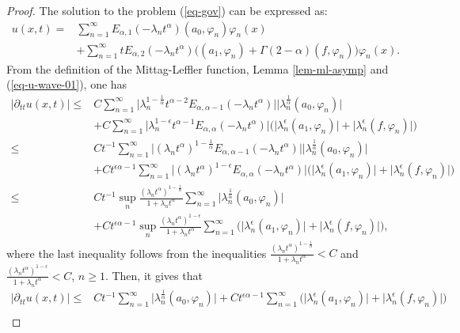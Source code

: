 \documentclass[11pt]{article}
\numberwithin{equation}{section}
\begin{document}
\begin{proof}
The solution to the problem (\ref{eq-gov}) can be expressed as:
\begin{align}\nonumber
u(x,t)=&\sum_{n=1}^{\infty}E_{\alpha,1}(-\lambda_nt^\alpha)(a_0,\varphi_n)\varphi_n(x)\\\label{eq-u-wave-01}
&+\sum_{n=1}^{\infty} t E_{\alpha,2}(-\lambda_n t^\alpha)\Big((a_1, \varphi_n)+\Gamma(2-\alpha)(f, \varphi_n)\Big) \varphi_n(x).
\end{align}
From the definition of the Mittag-Leffler function, Lemma \ref{lem-ml-asymp} and (\ref{eq-u-wave-01}), one has
\begin{align*}
|\partial_{tt}u(x,t)|
\le& C\sum_{n=1}^{\infty}  \big|\lambda_n^{1-\frac{1}{\alpha}}t^{\alpha-2}E_{\alpha,\alpha-1}(-\lambda_n t^\alpha)\big|\big|\lambda_n^{\frac{1}{\alpha}}(a_0, \varphi_n)\big|\\
&+C\sum_{n=1}^{\infty}\big|\lambda_n^{1-\epsilon}t^{\alpha-1}E_{\alpha,\alpha}(-\lambda_n t^\alpha)\big|\Big(\big|\lambda_n^{\epsilon}(a_1, \varphi_n)\big|+\big|\lambda_n^{\epsilon}(f, \varphi_n)\big|\Big)\\
\le&Ct^{-1}\sum_{n=1}^{\infty}  \big|(\lambda_nt^\alpha)^{1-\frac{1}{\alpha}}E_{\alpha,\alpha-1}(-\lambda_n t^\alpha)\big|\big|\lambda_n^{\frac{1}{\alpha}}(a_0, \varphi_n)\big|\\
&+Ct^{\epsilon\alpha-1}\sum_{n=1}^{\infty}  \big|(\lambda_nt^\alpha)^{1-\epsilon}E_{\alpha,\alpha}(-\lambda_n t^\alpha)\big|\Big(\big|\lambda_n^{\epsilon}(a_1, \varphi_n)\big|+\big|\lambda_n^{\epsilon}(f, \varphi_n)\big|\Big)\\
\le&Ct^{-1}\sup_n\frac{(\lambda_nt^\alpha)^{1-\frac{1}{\alpha}}}{1+\lambda_nt^\alpha}\sum_{n=1}^{\infty}\big|\lambda_n^{\frac{1}{\alpha}}(a_0, \varphi_n)\big|\\
&+Ct^{\epsilon\alpha-1}\sup_n\frac{(\lambda_nt^\alpha)^{1-\epsilon}}{1+\lambda_nt^\alpha}\sum_{n=1}^{\infty}\Big(\big|\lambda_n^{\epsilon}(a_1, \varphi_n)\big|+\big|\lambda_n^{\epsilon}(f, \varphi_n)\big|\Big),
\end{align*}
where the last inequality follows from the inequalities $\frac{(\lambda_nt^\alpha)^{1-\frac{1}{\alpha}}}{1+\lambda_nt^\alpha}<C$ and $\frac{(\lambda_nt^\alpha)^{1-\epsilon}}{1+\lambda_nt^\alpha}<C$, $n\geq1$.
Then, it gives that
\begin{align*}
|\partial_{tt}u(x,t)|
\le & Ct^{-1}\sum_{n=1}^{\infty}\big|\lambda_n^{\frac{1}{\alpha}}(a_0, \varphi_n)\big|+Ct^{\epsilon\alpha-1}\sum_{n=1}^{\infty}\Big(\big|\lambda_n^{\epsilon}(a_1, \varphi_n)\big|+\big|\lambda_n^{\epsilon}(f, \varphi_n)\big|\Big)\\

\end{align*}
\end{proof}
\end{document}

